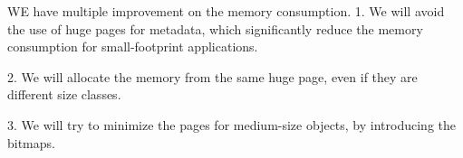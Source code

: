 WE have multiple improvement on the memory consumption. 
1. We will avoid the use of huge pages for metadata, which significantly reduce the memory consumption for small-footprint applications. 

2. We will allocate the memory from the same huge page, even if they are different size classes. 

3. We will try to minimize the pages for medium-size objects, by introducing the bitmaps. 
